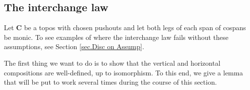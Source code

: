 \documentclass[11pt]{amsart}
\newcommand{\cat}[1]{\mathbf{#1}}
\theoremstyle{remark}
\theoremstyle{definition}
\begin{document}
\subsection{The interchange law}  %
%

Let $\cat{C}$ be a topos with chosen pushouts and let both legs of each span of cospans be monic. To see examples of where the interchange law fails without these assumptions, see Section \ref{sec.Disc on Assump}.

The first thing we want to do is to show that the vertical and horizontal compositions are well-defined, up to isomorphism. To this end, we give a lemma that will be put to work several times during the course of this section.
%
%
%
%
%
%
\end{document}
